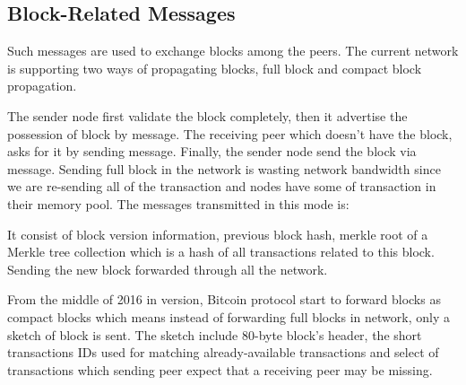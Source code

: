 \subsection{Block-Related Messages} Such messages are used to exchange \bc blocks among the peers. 
The current \bc network is supporting two ways of propagating blocks, full block and compact block
propagation. %

 The sender node first validate the block completely, then it advertise the possession of block by  message. The receiving peer which doesn't have the block, asks for it by sending  message. Finally, the sender node send the block via  message. Sending full block in the network is wasting network bandwidth since we are re-sending all of the transaction and nodes have some of transaction in their memory pool. The messages transmitted in this mode is: 

 It consist of block version information, previous block hash, merkle root of a Merkle tree collection which is a hash of all transactions related to this block. Sending  the new block forwarded through all the network.

From the middle of 2016 in  version, Bitcoin protocol start to forward blocks as compact blocks which means instead of forwarding full blocks in network, only a sketch of block is sent. The sketch include 80-byte block's header, the short transactions IDs used for matching already-available transactions and select of transactions which sending peer expect that a receiving peer may be missing.%

